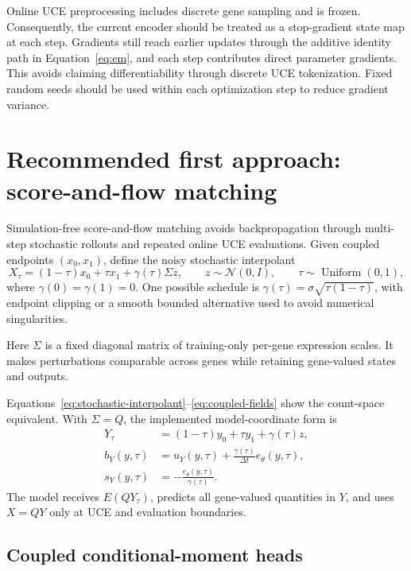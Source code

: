 \documentclass[11pt]{article}
\newcommand{\uce}{UCE}
\newcommand{\N}{\mathcal{N}}
\begin{document}
Online \uce{} preprocessing includes discrete gene sampling and is frozen.
Consequently, the current encoder should be treated as a stop-gradient state
map at each step. Gradients still reach earlier updates through the additive
identity path in Equation~\ref{eq:em}, and each step contributes direct
parameter gradients. This avoids claiming differentiability through discrete
\uce{} tokenization. Fixed random seeds should be used within each optimization
step to reduce gradient variance.

\section{Recommended first approach: score-and-flow matching}

Simulation-free score-and-flow matching avoids backpropagation through
multi-step stochastic rollouts and repeated online \uce{} evaluations. Given
coupled endpoints $(x_0,x_1)$, define the noisy stochastic interpolant
\begin{equation}
  X_\tau
  = (1-\tau)x_0+\tau x_1+\gamma(\tau)\Sigma z,
  \qquad z\sim\N(0,I),
  \qquad \tau\sim\operatorname{Uniform}(0,1),
  \label{eq:stochastic-interpolant}
\end{equation}
where $\gamma(0)=\gamma(1)=0$. One possible schedule is
$\gamma(\tau)=\sigma\sqrt{\tau(1-\tau)}$, with endpoint clipping or a smooth
bounded alternative used to avoid numerical singularities.

Here $\Sigma$ is a fixed diagonal matrix of training-only per-gene expression
scales. It makes perturbations comparable across genes while retaining
gene-valued states and outputs.

Equations~\ref{eq:stochastic-interpolant}--\ref{eq:coupled-fields} show the
count-space equivalent. With $\Sigma=Q$, the implemented model-coordinate
form is
\begin{align}
  Y_\tau&=(1-\tau)y_0+\tau y_1+\gamma(\tau)z,\\
  b_Y(y,\tau)&=u_Y(y,\tau)
    +\frac{\dot\gamma(\tau)}{\Delta t}e_\theta(y,\tau),\\
  s_Y(y,\tau)&=-\frac{e_\theta(y,\tau)}{\gamma(\tau)}.
  \label{eq:scaled-coupled-fields}
\end{align}
The model receives $E(QY_\tau)$, predicts all gene-valued quantities in $Y$,
and uses $X=QY$ only at UCE and evaluation boundaries.

\subsection{Coupled conditional-moment heads}
\end{document}
